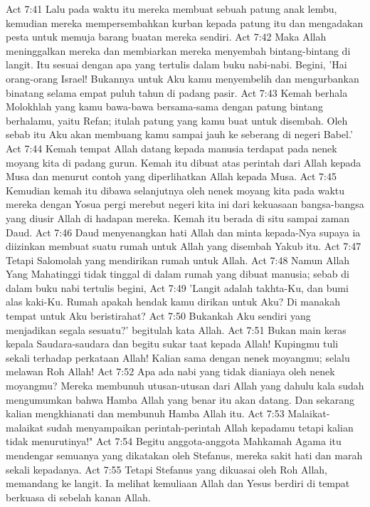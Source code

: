 Act 7:41  Lalu pada waktu itu mereka membuat sebuah patung anak lembu, kemudian mereka mempersembahkan kurban kepada patung itu dan mengadakan pesta untuk memuja barang buatan mereka sendiri.
Act 7:42  Maka Allah meninggalkan mereka dan membiarkan mereka menyembah bintang-bintang di langit. Itu sesuai dengan apa yang tertulis dalam buku nabi-nabi. Begini, 'Hai orang-orang Israel! Bukannya untuk Aku kamu menyembelih dan mengurbankan binatang selama empat puluh tahun di padang pasir.
Act 7:43  Kemah berhala Molokhlah yang kamu bawa-bawa bersama-sama dengan patung bintang berhalamu, yaitu Refan; itulah patung yang kamu buat untuk disembah. Oleh sebab itu Aku akan membuang kamu sampai jauh ke seberang di negeri Babel.'
Act 7:44  Kemah tempat Allah datang kepada manusia terdapat pada nenek moyang kita di padang gurun. Kemah itu dibuat atas perintah dari Allah kepada Musa dan menurut contoh yang diperlihatkan Allah kepada Musa.
Act 7:45  Kemudian kemah itu dibawa selanjutnya oleh nenek moyang kita pada waktu mereka dengan Yosua pergi merebut negeri kita ini dari kekuasaan bangsa-bangsa yang diusir Allah di hadapan mereka. Kemah itu berada di situ sampai zaman Daud.
Act 7:46  Daud menyenangkan hati Allah dan minta kepada-Nya supaya ia diizinkan membuat suatu rumah untuk Allah yang disembah Yakub itu.
Act 7:47  Tetapi Salomolah yang mendirikan rumah untuk Allah.
Act 7:48  Namun Allah Yang Mahatinggi tidak tinggal di dalam rumah yang dibuat manusia; sebab di dalam buku nabi tertulis begini,
Act 7:49  'Langit adalah takhta-Ku, dan bumi alas kaki-Ku. Rumah apakah hendak kamu dirikan untuk Aku? Di manakah tempat untuk Aku beristirahat?
Act 7:50  Bukankah Aku sendiri yang menjadikan segala sesuatu?' begitulah kata Allah.
Act 7:51  Bukan main keras kepala Saudara-saudara dan begitu sukar taat kepada Allah! Kupingmu tuli sekali terhadap perkataan Allah! Kalian sama dengan nenek moyangmu; selalu melawan Roh Allah!
Act 7:52  Apa ada nabi yang tidak dianiaya oleh nenek moyangmu? Mereka membunuh utusan-utusan dari Allah yang dahulu kala sudah mengumumkan bahwa Hamba Allah yang benar itu akan datang. Dan sekarang kalian mengkhianati dan membunuh Hamba Allah itu.
Act 7:53  Malaikat-malaikat sudah menyampaikan perintah-perintah Allah kepadamu tetapi kalian tidak menurutinya!"
Act 7:54  Begitu anggota-anggota Mahkamah Agama itu mendengar semuanya yang dikatakan oleh Stefanus, mereka sakit hati dan marah sekali kepadanya.
Act 7:55  Tetapi Stefanus yang dikuasai oleh Roh Allah, memandang ke langit. Ia melihat kemuliaan Allah dan Yesus berdiri di tempat berkuasa di sebelah kanan Allah.
